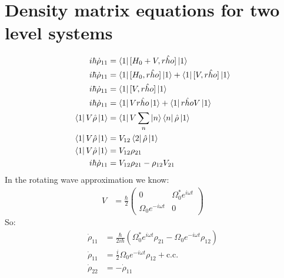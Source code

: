 \section{Density matrix equations for two level systems}
\begin{align*}
	i\hbar\dot{\rho}_{11} &= \bra{1}[H_0 + V, \hat{rho}]\ket{1} \\
	i\hbar\dot{\rho}_{11} &= \bra{1}[H_0, \hat{rho}]\ket{1} + \bra{1}[V, \hat{rho}]\ket{1} \\
	i\hbar\dot{\rho}_{11} &= \bra{1}[V, \hat{rho}]\ket{1} \\
	i\hbar\dot{\rho}_{11} &= \bra{1}V\hat{rho}\ket{1} + \bra{1}\hat{rho}V\ket{1} \\
	\bra{1}V\hat{\rho}\ket{1} &= \bra{1}V\sum_n\ket{n}\bra{n}\hat{\rho}\ket{1} \\
	\bra{1}V\hat{\rho}\ket{1} &= V_{12}\bra{2}\hat{\rho}\ket{1} \\
	\bra{1}V\hat{\rho}\ket{1} &= V_{12}\rho_{21} \\
	i\hbar\dot{\rho}_{11} &= V_{12}\rho_{21} - \rho_{12}V_{21}
\end{align*}
In the rotating wave approximation we know:
\begin{align*}
	V &= \frac{\hbar}{2} \begin{pmatrix}
		0 & \Omega_0^* e^{i\omega t} \\
		\Omega_0 e^{-i\omega t} & 0
		      \end{pmatrix}
\end{align*}
So:
\begin{align*}
	\dot{\rho}_{11} &= \frac{\hbar}{2i\hbar}\left(\Omega_0^* e^{i\omega t}\rho_{21} - \Omega_0 e^{-i\omega t} \rho_{12}\right) \\ 
	\dot{\rho}_{11} &= \frac{i}{2}\Omega_0 e^{-i\omega t} \rho_{12} + \text{c.c.} \\
	\dot{\rho}_{22} &= -\dot{\rho}_{11}
\end{align*}

